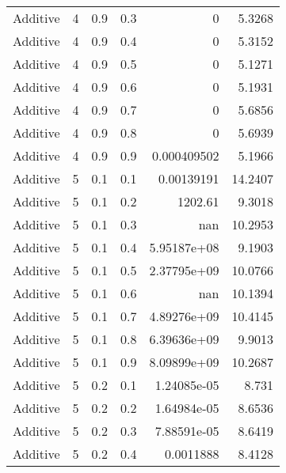 \documentclass{article}
\begin{document}
\begin{longtable}[H]{lrrrrr}
 Additive       &       4 &   0.9 &            0.3 &      0           &          5.3268 \\
 Additive       &       4 &   0.9 &            0.4 &      0           &          5.3152 \\
 Additive       &       4 &   0.9 &            0.5 &      0           &          5.1271 \\
 Additive       &       4 &   0.9 &            0.6 &      0           &          5.1931 \\
 Additive       &       4 &   0.9 &            0.7 &      0           &          5.6856 \\
 Additive       &       4 &   0.9 &            0.8 &      0           &          5.6939 \\
 Additive       &       4 &   0.9 &            0.9 &      0.000409502 &          5.1966 \\
 Additive       &       5 &   0.1 &            0.1 &      0.00139191  &         14.2407 \\
 Additive       &       5 &   0.1 &            0.2 &   1202.61        &          9.3018 \\
 Additive       &       5 &   0.1 &            0.3 &    nan           &         10.2953 \\
 Additive       &       5 &   0.1 &            0.4 &      5.95187e+08 &          9.1903 \\
 Additive       &       5 &   0.1 &            0.5 &      2.37795e+09 &         10.0766 \\
 Additive       &       5 &   0.1 &            0.6 &    nan           &         10.1394 \\
 Additive       &       5 &   0.1 &            0.7 &      4.89276e+09 &         10.4145 \\
 Additive       &       5 &   0.1 &            0.8 &      6.39636e+09 &          9.9013 \\
 Additive       &       5 &   0.1 &            0.9 &      8.09899e+09 &         10.2687 \\
 Additive       &       5 &   0.2 &            0.1 &      1.24085e-05 &          8.731  \\
 Additive       &       5 &   0.2 &            0.2 &      1.64984e-05 &          8.6536 \\
 Additive       &       5 &   0.2 &            0.3 &      7.88591e-05 &          8.6419 \\
 Additive       &       5 &   0.2 &            0.4 &      0.0011888   &          8.4128 \\

\end{longtable}
\end{document}

